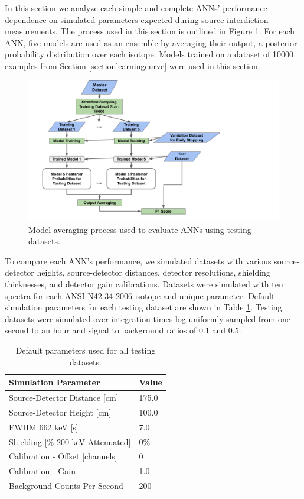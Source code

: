 In this section we analyze each simple and complete ANNs' performance dependence on simulated parameters expected during source interdiction measurements. The process used in this section is outlined in Figure \ref{fig:generalization_performance_diagram}. For each ANN, five models are used as an ensemble by averaging their output, a posterior probability distribution over each isotope. Models trained on a dataset of 10000 examples from Section \ref{sectionlearningcurve} were used in this section.

\begin{figure}[H]
	\centering
	\includegraphics[trim=0 0 210 0,clip,width=1.0\linewidth]{images/generalization_performance_diagram}
	\caption{Model averaging process used to evaluate ANNs using testing datasets.}
	\label{fig:generalization_performance_diagram}
\end{figure}

To compare each ANN's performance, we simulated datasets with various source-detector heights, source-detector distances, detector resolutions, shielding thicknesses, and detector gain calibrations. Datasets were simulated with ten spectra for each ANSI N42-34-2006 isotope and unique parameter. Default simulation parameters for each testing dataset are shown in Table \ref{table:default_sim_params}. Testing datasets were simulated over integration times log-uniformly sampled from one second to an hour and signal to background ratios of 0.1 and 0.5.

\begin{table}[H]
\centering
\caption{Default parameters used for all testing datasets.}
\label{table:default_sim_params}
\begin{tabular}{ll}
\hline
\textbf{Simulation Parameter} &  \textbf{Value} \\ \hline
Source-Detector Distance [cm] & 175.0\\ 
Source-Detector Height [cm] & 100.0\\ 
FWHM 662 keV [s] & 7.0\\ 
Shielding [\% 200 keV Attenuated] & 0\% \\ 
Calibration - Offset [channels] & 0 \\ 
Calibration - Gain & 1.0 \\ 
Background Counts Per Second & 200 \\ \hline 
\end{tabular}
\end{table}


